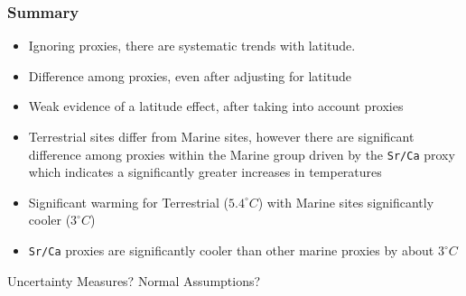 \documentclass[handout]{beamer}
\begin{document}
\begin{frame}
  \frametitle{Summary}
  \begin{itemize}
   \item Ignoring proxies, there are systematic trends with
     latitude. \pause
  \item Difference among proxies, even after adjusting for latitude \pause
\item Weak evidence of a latitude effect, after taking into account proxies
\pause
 \item  Terrestrial sites differ from Marine sites, however there are significant difference among
      proxies within the Marine group  driven by the {\tt Sr/Ca} proxy which
      indicates a significantly greater increases in temperatures 
\pause
   \item Significant warming for Terrestrial ($5.4 ^\circ C$) with
     Marine  sites   significantly  cooler ($3^ \circ  C$)\pause 
   \item {\tt Sr/Ca} proxies are significantly cooler than other
     marine proxies by about $3^\circ C$ \pause
  \end{itemize}

Uncertainty Measures?  \pause  Normal Assumptions? 
\end{frame}
\end{document}
